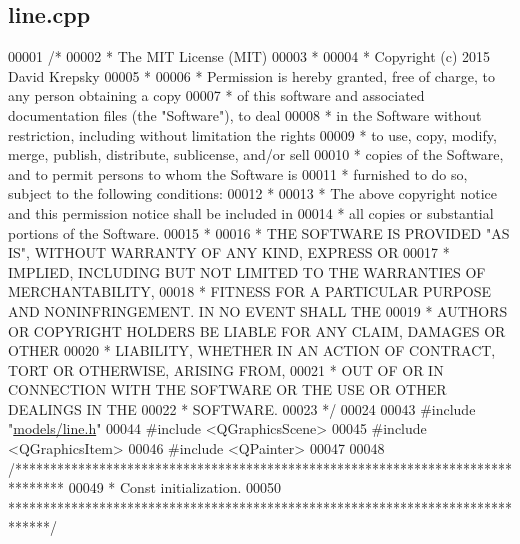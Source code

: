 \hypertarget{line_8cpp_source}{}\subsection{line.\+cpp}
\label{line_8cpp_source}

\begin{DoxyCode}
00001 \textcolor{comment}{/*}
00002 \textcolor{comment}{ * The MIT License (MIT)}
00003 \textcolor{comment}{ *}
00004 \textcolor{comment}{ * Copyright (c) 2015 David Krepsky}
00005 \textcolor{comment}{ *}
00006 \textcolor{comment}{ * Permission is hereby granted, free of charge, to any person obtaining a copy}
00007 \textcolor{comment}{ * of this software and associated documentation files (the "Software"), to deal}
00008 \textcolor{comment}{ * in the Software without restriction, including without limitation the rights}
00009 \textcolor{comment}{ * to use, copy, modify, merge, publish, distribute, sublicense, and/or sell}
00010 \textcolor{comment}{ * copies of the Software, and to permit persons to whom the Software is}
00011 \textcolor{comment}{ * furnished to do so, subject to the following conditions:}
00012 \textcolor{comment}{ *}
00013 \textcolor{comment}{ * The above copyright notice and this permission notice shall be included in}
00014 \textcolor{comment}{ * all copies or substantial portions of the Software.}
00015 \textcolor{comment}{ *}
00016 \textcolor{comment}{ * THE SOFTWARE IS PROVIDED "AS IS", WITHOUT WARRANTY OF ANY KIND, EXPRESS OR}
00017 \textcolor{comment}{ * IMPLIED, INCLUDING BUT NOT LIMITED TO THE WARRANTIES OF MERCHANTABILITY,}
00018 \textcolor{comment}{ * FITNESS FOR A PARTICULAR PURPOSE AND NONINFRINGEMENT. IN NO EVENT SHALL THE}
00019 \textcolor{comment}{ * AUTHORS OR COPYRIGHT HOLDERS BE LIABLE FOR ANY CLAIM, DAMAGES OR OTHER}
00020 \textcolor{comment}{ * LIABILITY, WHETHER IN AN ACTION OF CONTRACT, TORT OR OTHERWISE, ARISING FROM,}
00021 \textcolor{comment}{ * OUT OF OR IN CONNECTION WITH THE SOFTWARE OR THE USE OR OTHER DEALINGS IN THE}
00022 \textcolor{comment}{ * SOFTWARE.}
00023 \textcolor{comment}{ */}
00024 
00043 \textcolor{preprocessor}{#include "\hyperlink{line_8h}{models/line.h}"}
00044 \textcolor{preprocessor}{#include <QGraphicsScene>}
00045 \textcolor{preprocessor}{#include <QGraphicsItem>}
00046 \textcolor{preprocessor}{#include <QPainter>}
00047 
00048 \textcolor{comment}{/*******************************************************************************}
00049 \textcolor{comment}{ * Const initialization.}
00050 \textcolor{comment}{ ******************************************************************************/}

\end{DoxyCode}
